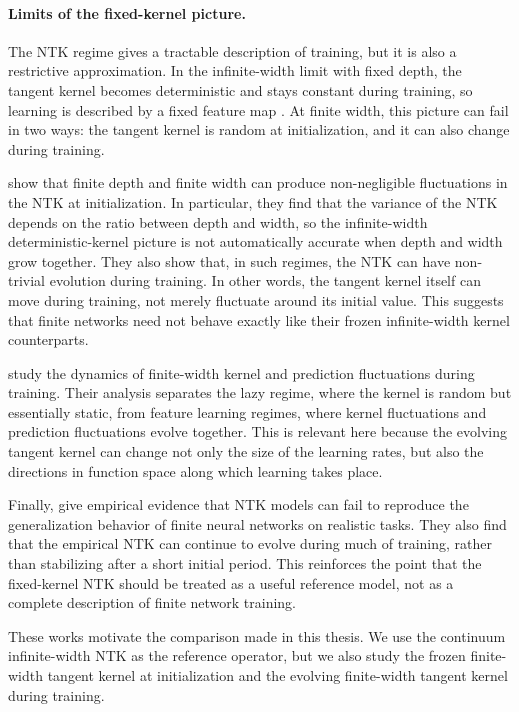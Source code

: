 \begin{revblock}
	\paragraph{Limits of the fixed-kernel picture.}
	The NTK regime gives a tractable description of training, but it is also a
	restrictive approximation. In the infinite-width limit with fixed depth, the
	tangent kernel becomes deterministic and stays constant during training, so
	learning is described by a fixed feature map
	\citep{jacot2018ntk,lee2020wide}. At finite width, this picture can fail in two
	ways: the tangent kernel is random at initialization, and it can also change
	during training.

	\citet{haninNica2019finite} show that finite depth and finite width can produce
	non-negligible fluctuations in the NTK at initialization. In particular, they
	find that the variance of the NTK depends on the ratio between depth and width,
	so the infinite-width deterministic-kernel picture is not automatically
	accurate when depth and width grow together. They also show that, in such
	regimes, the NTK can have non-trivial evolution during training. In other
	words, the tangent kernel itself can move during training, not merely fluctuate
	around its initial value. This suggests that finite networks need not behave
	exactly like their frozen infinite-width kernel counterparts.

	\citet{bordelon2023dynamicsfinitewidthkernel} study the dynamics of finite-width
	kernel and prediction fluctuations during training. Their analysis separates the
	lazy regime, where the kernel is random but essentially static, from feature
	learning regimes, where kernel fluctuations and prediction fluctuations evolve
	together. This is relevant here because the evolving tangent kernel can change
	not only the size of the learning rates, but also the directions in function
	space along which learning takes place.

	Finally,
	\citet{vyas2022limitationsntkunderstandinggeneralization} give empirical
	evidence that NTK models can fail to reproduce the generalization behavior of
	finite neural networks on realistic tasks. They also find that the empirical NTK
	can continue to evolve during much of training, rather than stabilizing after a
	short initial period. This reinforces the point that the fixed-kernel NTK should
	be treated as a useful reference model, not as a complete description of finite
	network training.

	These works motivate the comparison made in this thesis. We use the continuum
	infinite-width NTK as the reference operator, but we also study the frozen
	finite-width tangent kernel at initialization and the evolving finite-width
	tangent kernel during training.
\end{revblock}


